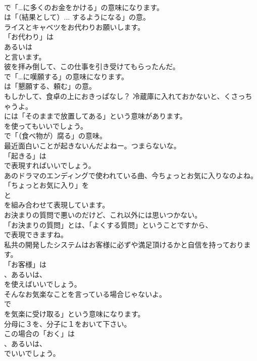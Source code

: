 \documentclass[8pt]{extreport}
\begin{document}
\begin{CJK}{UTF8}{min}
\\	で「…に多くのお金をかける」の意味になります。
\\	は「（結果として）... するようになる」の意。	
\\	ライスとキャベツをお代わりお願いします。 
\\	「お代わり」は
\\	あるいは
\\	と言います。	
\\	彼を拝み倒して、この仕事を引き受けてもらったんだ。 
\\	で「…に嘆願する」の意味になります。
\\	は「懇願する、頼む」の意。	
\\	もしかして、食卓の上におきっぱなし？ 冷蔵庫に入れておかないと、くさっちゃうよ。 
\\	には「そのままで放置してある」という意味があります。
\\	を使ってもいいでしょう。
\\	で「（食べ物が）腐る」の意味。	
\\	最近面白いことが起きないんだよねー。つまらないな。 
\\	「起きる」は 
\\	で表現すればいいでしょう。	
\\	あのドラマのエンディングで使われている曲、今ちょっとお気に入りなのよね。 
\\	「ちょっとお気に入り」を
\\	と
\\	を組み合わせて表現しています。	
\\	お決まりの質問で悪いのだけど、これ以外には思いつかない。 
\\	「お決まりの質問」とは、「よくする質問」ということですから、
\\	で表現できますね。	
\\	私共の開発したシステムはお客様に必ずや満足頂けるかと自信を持っております。 
\\	「お客様」は
\\	、あるいは、
\\	を使えばいいでしょう。	
\\	そんなお気楽なことを言っている場合じゃないよ。 
\\	で
\\	を気楽に受け取る」という意味になります。	
\\	分母に３を、分子に１をおいて下さい。 
\\	この場合の「おく」は
\\	、あるいは、
\\	でいいでしょう。	

\end{CJK}
\end{document}
